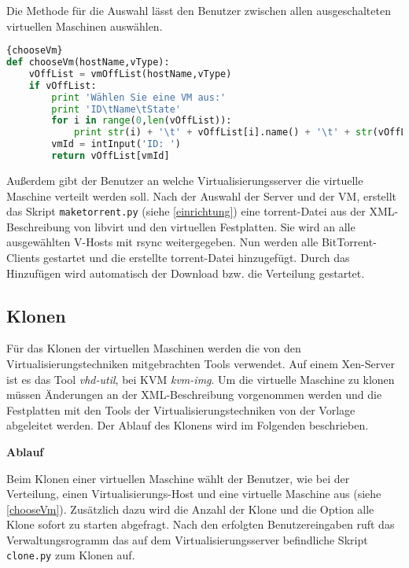 Die Methode für die Auswahl lässt den Benutzer zwischen allen ausgeschalteten virtuellen Maschinen auswählen.
\\
\begin{lstlisting}[caption=VM-Auswahl,language=Python, label=chooseVm]{chooseVm}
def chooseVm(hostName,vType):
	vOffList = vmOffList(hostName,vType)
	if vOffList:
		print 'Wählen Sie eine VM aus:'
		print 'ID\tName\tState'
		for i in range(0,len(vOffList)):
			print str(i) + '\t' + vOffList[i].name() + '\t' + str(vOffList[i].info()[0])
		vmId = intInput('ID: ')
		return vOffList[vmId]
\end{lstlisting}
Außerdem gibt der Benutzer an welche Virtualisierungsserver die virtuelle Maschine verteilt werden soll. Nach der Auswahl der Server und der VM, erstellt das Skript \lstinline|maketorrent.py| (siehe \ref{einrichtung}) eine torrent-Datei aus der XML-Beschreibung von libvirt und den virtuellen Festplatten. Sie wird an alle ausgewählten V-Hosts mit rsync weitergegeben. Nun werden alle BitTorrent-Clients gestartet und die erstellte torrent-Datei hinzugefügt. Durch das Hinzufügen wird automatisch der Download bzw. die Verteilung gestartet.

\subsection{Klonen}
Für das Klonen der virtuellen Maschinen werden die von den Virtualisierungstechniken mitgebrachten Tools verwendet. Auf einem Xen-Server ist es das Tool \textit{vhd-util}, bei KVM \textit{kvm-img}. Um die virtuelle Maschine zu klonen müssen Änderungen an der XML-Beschreibung vorgenommen werden und die Festplatten mit den Tools der Virtualisierungstechniken von der Vorlage abgeleitet werden. Der Ablauf des Klonens wird im Folgenden beschrieben.  %

\textbf{Ablauf}

Beim Klonen einer virtuellen Maschine wählt der Benutzer, wie bei der Verteilung, einen Virtualisierungs-Host und eine virtuelle Maschine aus (siehe \ref{chooseVm}). Zusätzlich dazu wird die Anzahl der Klone und die Option alle Klone sofort zu starten abgefragt. Nach den erfolgten Benutzereingaben ruft das Verwaltungsrogramm das auf dem Virtualisierungsserver befindliche Skript \lstinline|clone.py| zum Klonen auf.

